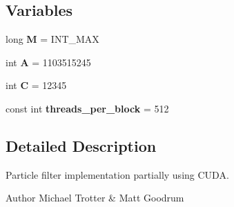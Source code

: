 \subsection*{Variables}
\begin{DoxyCompactItemize}
\item 
\hypertarget{ex__particle__CUDA__naive__full_8cu_a4bc2e1f1527e2a5d555689a4288c341f}{
long {\bfseries M} = INT\_\-MAX}
\label{ex__particle__CUDA__naive__full_8cu_a4bc2e1f1527e2a5d555689a4288c341f}

\item 
\hypertarget{ex__particle__CUDA__naive__full_8cu_a56a52f73797a8d06045cf5bc1ab831bf}{
int {\bfseries A} = 1103515245}
\label{ex__particle__CUDA__naive__full_8cu_a56a52f73797a8d06045cf5bc1ab831bf}

\item 
\hypertarget{ex__particle__CUDA__naive__full_8cu_a5464533d23b59ba11030432e73528730}{
int {\bfseries C} = 12345}
\label{ex__particle__CUDA__naive__full_8cu_a5464533d23b59ba11030432e73528730}

\item 
\hypertarget{ex__particle__CUDA__naive__full_8cu_ac1fd9bf7fbbc3bd648ba96689efd1982}{
const int {\bfseries threads\_\-per\_\-block} = 512}
\label{ex__particle__CUDA__naive__full_8cu_ac1fd9bf7fbbc3bd648ba96689efd1982}

\end{DoxyCompactItemize}


\subsection{Detailed Description}
Particle filter implementation partially using CUDA. \begin{DoxyAuthor}{Author}
Michael Trotter \& Matt Goodrum 
\end{DoxyAuthor}


